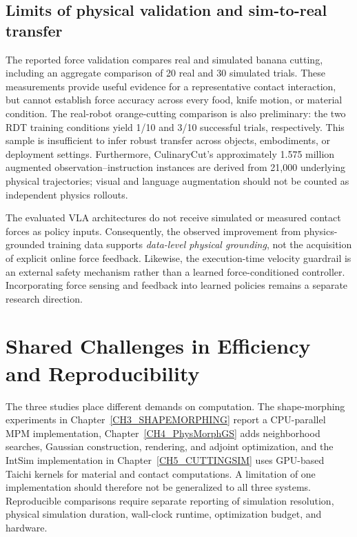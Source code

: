 \subsection{Limits of physical validation and sim-to-real transfer}
The reported force validation compares real and simulated banana cutting, including an aggregate comparison of 20 real and 30 simulated trials. These measurements provide useful evidence for a representative contact interaction, but cannot establish force accuracy across every food, knife motion, or material condition. The real-robot orange-cutting comparison is also preliminary: the two RDT training conditions yield 1/10 and 3/10 successful trials, respectively. This sample is insufficient to infer robust transfer across objects, embodiments, or deployment settings. Furthermore, CulinaryCut's approximately 1.575 million augmented observation--instruction instances are derived from 21,000 underlying physical trajectories; visual and language augmentation should not be counted as independent physics rollouts.

The evaluated VLA architectures do not receive simulated or measured contact forces as policy inputs. Consequently, the observed improvement from physics-grounded training data supports \emph{data-level physical grounding}, not the acquisition of explicit online force feedback. Likewise, the execution-time velocity guardrail is an external safety mechanism rather than a learned force-conditioned controller. Incorporating force sensing and feedback into learned policies remains a separate research direction.

\section{Shared Challenges in Efficiency and Reproducibility}
\label{subsec:lim-scope}

The three studies place different demands on computation. The shape-morphing experiments in Chapter~\ref{CH3_SHAPEMORPHING} report a CPU-parallel MPM implementation, Chapter~\ref{CH4_PhysMorphGS} adds neighborhood searches, Gaussian construction, rendering, and adjoint optimization, and the IntSim implementation in Chapter~\ref{CH5_CUTTINGSIM} uses GPU-based Taichi kernels for material and contact computations. A limitation of one implementation should therefore not be generalized to all three systems. Reproducible comparisons require separate reporting of simulation resolution, physical simulation duration, wall-clock runtime, optimization budget, and hardware.

